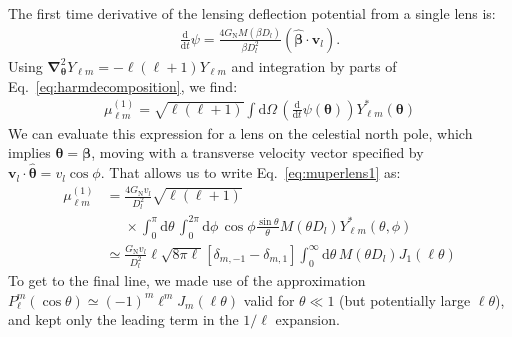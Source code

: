 \documentclass[prd,aps,10pt,nofootinbib,twocolumn,superscriptaddress,preprintnumbers,balancelastpage,longbibliography]{revtex4-1}
\newcommand{\vect}[1]{\boldsymbol{\mathbf{#1}}}
\newcommand{\dd}{\mathrm{d}}
\newcommand{\ellm}{{\ell m}}
\newcommand{\GN}{G_\mathrm{N}}
\begin{document}
The first time derivative of the lensing deflection potential from a single lens is:
\begin{align}
\frac{\dd}{\dd t} \psi = \frac{4\GN M(\beta D_l)}{\beta D_l^2}(\hat{\vect{\beta}} \cdot {\vect{v}}_l ).
\end{align}
Using $\vect{\nabla}_{\vect{\theta}}^2 Y_{\ell m} = -\ell(\ell+1)Y_{\ell m}$ and integration by parts of Eq.~\ref{eq:harmdecomposition}, we find:
\begin{align}
\mu_{\ell m}^{(1)} = \sqrt{\ell(\ell+1)}\int \dd\Omega\, \left(\frac{\dd}{\dd t} \psi(\vect{\theta})\right) Y_{\ellm}^*(\vect{\theta}) \label{eq:muperlens1}
\end{align}
We can evaluate this expression for a lens on the celestial north pole, which implies $\vect{\theta} = \vect{\beta}$, moving with a transverse velocity vector specified by $\vect{v}_l \cdot \hat{\vect{\theta}}  = v_l \cos \phi$.
That allows us to write Eq.~\ref{eq:muperlens1} as:
\begin{align}
\mu_{\ell m}^{(1)} &= \frac{4 \GN v_l}{D_l^2} \sqrt{\ell(\ell+1)}\label{eq:muNP}\\
&\phantom{=}\times \int_0^\pi \dd \theta \, \int_0^{2\pi} \dd \phi \, \cos\phi  \frac{\sin \theta}{\theta} M(\theta D_l) Y^*_{\ell m}(\theta,\phi) \nonumber\\
&\simeq \frac{\GN v_l}{D_l^2} \ell \sqrt{8\pi \ell}\left[\delta_{m,-1}-\delta_{m,1}\right]\int_0^\infty \dd \theta \, M(\theta D_l) J_1(\ell \theta)\nonumber
\end{align}
To get to the final line, we made use of the approximation $P_\ell^m(\cos\theta) \simeq (-1)^m \ell^m J_m(\ell \theta)$ valid for $\theta \ll 1$ (but potentially large $\ell \theta$), and kept only the leading term in the  $1/\ell$ expansion. 
\end{document}
